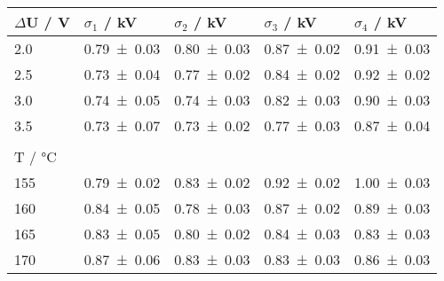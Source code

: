 \begin{tabular}{lllll}
\toprule
$\Delta$U / \si{\volt} & $\sigma_1$ / \si{\kilo\volt} & $\sigma_2$ / \si{\kilo\volt} & $\sigma_3$ / \si{\kilo\volt} & $\sigma_4$ / \si{\kilo\volt} \\
\midrule
\num{2,0}	& \num{0.79+-0.03} &	\num{0.80+-0.03} &	\num{0.87+-0.02} &	\num{0.91+-0.03}	\\
\num{2.5}	& \num{0.73+-0.04} &	\num{0.77+-0.02} &	\num{0.84+-0.02} &	\num{0.92+-0.02}	\\
\num{3,0}	& \num{0.74+-0.05} &	\num{0.74+-0.03} &	\num{0.82+-0.03} &	\num{0.90+-0.03}	\\
\num{3.5}	& \num{0.73+-0.07} &	\num{0.73+-0.02} &	\num{0.77+-0.03} &	\num{0.87+-0.04}	\\
	      &					  &			  	 	  &					  &			\\
T / \si{\degreeCelsius} & & & & \\
\midrule
\num{155}	& \num{0.79+-0.02} &	\num{0.83+-0.02} &	\num{0.92+-0.02} &	\num{1.00+-0.03}	\\
\num{160}	& \num{0.84+-0.05} &	\num{0.78+-0.03} &	\num{0.87+-0.02} &	\num{0.89+-0.03}	\\
\num{165}	& \num{0.83+-0.05} &	\num{0.80+-0.02} &	\num{0.84+-0.03} &	\num{0.83+-0.03}	\\
\num{170}	& \num{0.87+-0.06} &	\num{0.83+-0.03} &	\num{0.83+-0.03} &	\num{0.86+-0.03} 	\\
\bottomrule
\end{tabular}